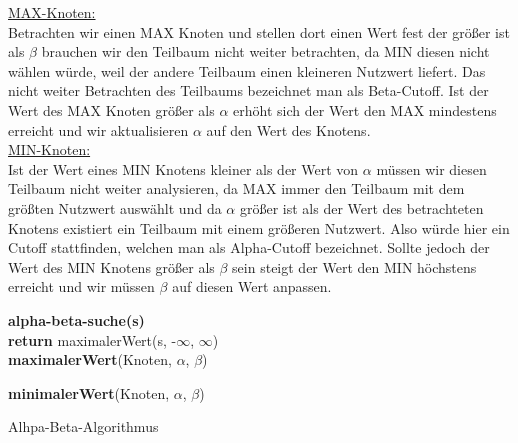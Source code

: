  \underline{MAX-Knoten:}\\
 Betrachten wir einen MAX Knoten und stellen dort einen Wert fest der größer ist als $\beta$ brauchen wir den Teilbaum nicht weiter betrachten, da MIN diesen nicht wählen würde, weil der andere Teilbaum einen kleineren Nutzwert liefert. Das nicht weiter Betrachten des Teilbaums bezeichnet man als Beta-Cutoff. Ist  der Wert des MAX Knoten größer als $\alpha$ erhöht sich der Wert den MAX mindestens erreicht und wir aktualisieren $\alpha$ auf den Wert des Knotens.  \\

 \underline{MIN-Knoten:}\\
 Ist der Wert eines MIN Knotens kleiner als der Wert von $\alpha$ müssen wir diesen Teilbaum nicht weiter analysieren, da MAX immer den Teilbaum mit dem größten Nutzwert auswählt und da $\alpha$ größer ist als der Wert des betrachteten Knotens existiert ein Teilbaum mit einem größeren Nutzwert. Also würde hier ein Cutoff stattfinden, welchen man als Alpha-Cutoff bezeichnet. Sollte jedoch der Wert des MIN Knotens größer als $\beta$ sein steigt der Wert den MIN höchstens erreicht und wir müssen $\beta$ auf diesen Wert anpassen.


 \begin{algorithm}
 	\textbf{alpha-beta-suche(s)}\\

 	\textbf{return} maximalerWert(s, -$\infty$, $\infty$)\\

 	\textbf{maximalerWert}(Knoten, $\alpha$, $\beta$)\\


	\textbf{minimalerWert}(Knoten, $\alpha$, $\beta$)\\

 	\caption{Alhpa-Beta-Algorithmus}
\end{algorithm}
\newpage


